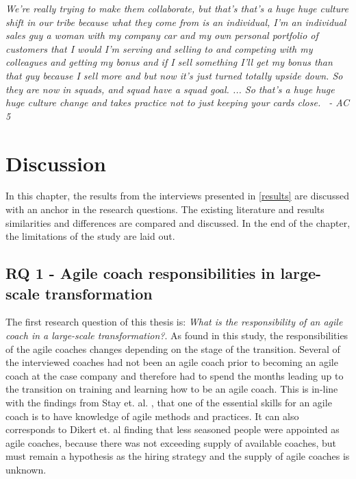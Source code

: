 \documentclass[11pt,a4paper]{report}
\begin{document}
\begin{displayquote}
\textit{
We're really trying to make them collaborate, but that's that's a huge huge culture shift in our tribe because what they come from is an individual, I'm an individual sales guy a woman with my company car and my own personal portfolio of customers that I would I'm serving and selling to and competing with my colleagues and getting my bonus and if I sell something I'll get my bonus than that guy because I sell more and but now it's just turned totally upside down. So they are now in squads, and squad have a squad goal. ... So that's a huge huge huge culture change and takes practice not to just keeping your cards close.  - AC 5
}
\end{displayquote}

\chapter{Discussion}

In this chapter, the results from the interviews presented in \autoref{results} are discussed with an anchor in the research questions. The existing literature and results similarities and differences are compared and discussed. In the end of the chapter,  the limitations of the study are laid out.

\section{RQ 1 - Agile coach responsibilities in large-scale transformation}
The first research question of this thesis is: \textit{What is the responsibility of an agile coach in a large-scale transformation?}. As found in this study, the responsibilities of the agile coaches changes depending on the stage of the transition. Several of the interviewed coaches had not been an agile coach prior to becoming an agile coach at the case company and therefore had to spend the months leading up to the transition on training and learning how to be an agile coach. This is in-line with the findings from Stay et. al. \cite{stray2020agile}, that one of the essential skills for an agile coach is to have knowledge of agile methods and practices. It can also corresponds to Dikert et. al \cite{dikert2016challenges} finding that less seasoned people were appointed as agile coaches, because there was not exceeding supply of available coaches, but must remain a hypothesis as the hiring strategy and the supply of agile coaches is unknown.
\end{document}
